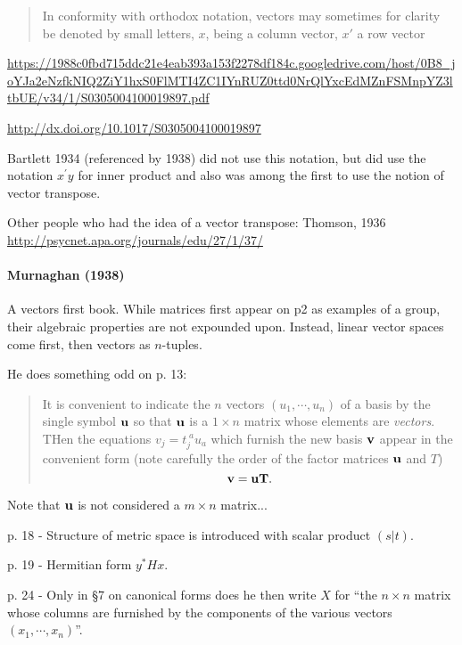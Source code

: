 \begin{quote}
In conformity with orthodox notation, vectors may sometimes for clarity be
denoted by small letters, $x$, being a column vector, $x'$ a row vector
\end{quote}

\url{https://1988c0fbd715ddc21e4eab393a153f2278df184c.googledrive.com/host/0B8_joYJa2eNzfkNIQ2ZiY1hxS0FlMTI4ZC1IYnRUZ0ttd0NrQlYxcEdMZnFSMnpYZ3ltbUE/v34/1/S0305004100019897.pdf}

\url{http://dx.doi.org/10.1017/S0305004100019897}

Bartlett 1934 (referenced by 1938) did not use this notation, but did use the
notation $x^\prime y$ for inner product and also was among the first to use the
notion of vector transpose.

Other people who had the idea of a vector transpose:
Thomson, 1936
\url{http://psycnet.apa.org/journals/edu/27/1/37/}


\paragraph{Murnaghan (1938)~\cite{Murnaghan1938}}

A vectors first book. While matrices first appear on p2 as examples of a group,
their algebraic properties are not expounded upon. Instead, linear vector spaces
come first, then vectors as $n$-tuples.

He does something odd on p. 13:

\begin{quote}
    It is convenient to indicate the $n$ vectors $(u_1, \cdots, u_n)$ of a basis
    by the single symbol $\bf u$ so that $\bf u$ is a $1\times n$ matrix
    whose elements are \textit{vectors}. THen the equations $v_j = t_j^{\;a} u_a$
    which furnish the new basis $\bf v$ appear in the convenient form (note
    carefully the order of the factor matrices $\bf u$ and $T$)
    \[
    \bf v = \bf u T.
    \]
\end{quote}

Note that $\bf u$ is not considered a $m\times n$ matrix...

p. 18 - Structure of metric space is introduced with scalar product $(s|t)$.

p. 19 - Hermitian form $y^* H x$.

p. 24 - Only in \S7 on canonical forms does he then write $X$ for ``the $n\times n$
matrix whose columns are furnished by the components of the various vectors
$(x_1, \cdots, x_n)$''.

